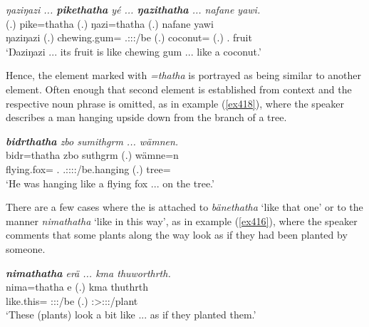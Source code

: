\begin{exe}
	\ex \emph{ŋaziŋazi ... \textbf{pikethatha} yé ... \textbf{ŋazithatha} ... nafane yawi.}\\
	 (.) pike=thatha  (.) ŋazi=thatha (.) nafane yawi\\
	ŋaziŋazi (.) chewing.gum=\Simil{} \Tsg.\Masc:\Sbj:\Nonpast:\Ipfv/be (.) coconut=\Simil{} (.) \Tsg.{\Poss} fruit\\ 
	\trans `Ŋaziŋazi ... its fruit is like chewing gum ... like a coconut.'\\
	\label{ex417}
\end{exe}

Hence, the element marked with \emph{=thatha} is portrayed as being similar to another element. Often enough that second element is established from context and the respective noun phrase is omitted, as in example (\ref{ex418}), where the speaker describes a man hanging upside down from the branch of a tree.

\begin{exe}
	\ex \emph{\textbf{bidrthatha} zbo sumithgrm ... wämnen.}\\
	\gll bidr=thatha zbo suthgrm (.) wämne=n\\
	{{flying.fox}=\Simil{}} {\Prox.{\All}} \Tsg.\Masc:\Sbj:\Pst:\Dur:\Stat/be.hanging (.) tree=\Loc\\
	\trans `He was hanging like a flying fox ... on the tree.'
	\label{ex418}
\end{exe}

There are a few cases where the   is attached to   \emph{bänethatha} `like that one' or to the manner  \emph{nimathatha} `like in this way', as in example (\ref{ex416}), where the speaker comments that some plants along the way look as if they had been planted by someone.

\begin{exe}
	\ex \emph{\textbf{nimathatha} erä ... kma thuworthrth.}\\
	\gll nima=thatha e (.) kma thuthrth\\
	{like.this}=\Simil{} \Stpl:\Sbj:\Nonpast:\Ipfv/be (.) {\Pot} \Stpl:\Sbj>\Stpl:\Obj:\Rpst:\Ipfv/plant\\ 
	\trans `These (plants) look a bit like ... as if they planted them.'
	\label{ex416}
\end{exe}

